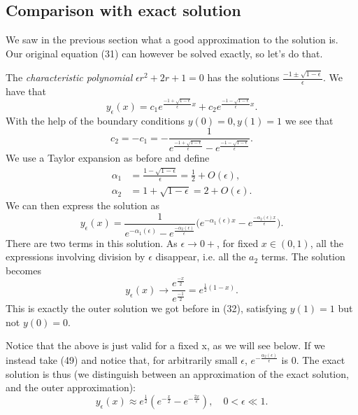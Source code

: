 \documentclass[12pt]{article}
\begin{document}
\subsection{Comparison with exact solution}

We saw in the previous section what a good approximation to the
solution is. Our original equation (31) can however be solved exactly,
so let's do that.

The \textit{characteristic polynomial} $\epsilon r^2 +2r + 1 = 0$ has
the solutions $\frac{-1 \pm \sqrt{1-\epsilon}}{\epsilon}$. We have
that
\begin{equation}
y_{\epsilon}(x)=c_1 e^{\frac{-1 + \sqrt{1-\epsilon}}{\epsilon} x} + c_2
e^{\frac{-1 - \sqrt{1-\epsilon}}{\epsilon} x}.
\end{equation}
With the help of the boundary conditions $y(0)=0, y(1)=1$ we see that
\begin{equation}
  c_2 = - c_1 = - \frac{1}{e^{\frac{-1 + \sqrt{1-\epsilon}}{\epsilon}}
    - e^{\frac{-1 - \sqrt{1-\epsilon}}{\epsilon}}}.
\end{equation}
We use a Taylor expansion as before and define
\begin{align}
  \alpha_1 &= \frac{1 - \sqrt{1-\epsilon}}{\epsilon} = \frac{1}{2} + O(\epsilon), \\
  \alpha_2 &= 1+ \sqrt{1-\epsilon} = 2 + O(\epsilon).
\end{align}
We can then express the solution as
\begin{equation}
  y_{\epsilon}(x) = \frac{1}{e^{-\alpha_1(\epsilon)} - e^{\frac{-\alpha_2(\epsilon)}{\epsilon}}} \Big(e^{-\alpha_1(\epsilon)x} - e^{\frac{-\alpha_2(\epsilon)x}{\epsilon}}\Big).
\end{equation}
There are two terms in this solution. As $\epsilon \to 0+$, for fixed
$x \in (0,1)$, all the expressions involving division by $\epsilon$
disappear, i.e. all the $a_2$ terms. The solution becomes
\begin{equation}
  y_{\epsilon}(x) \to \frac{e^{\frac{-x}{2}}}{e^{\frac{-1}{2}}} = e^{\frac{1}{2}(1-x)}.
\end{equation}
This is exactly the outer solution we got before in (32), satisfying
$y(1)=1$ but not $y(0)=0$.

Notice that the above is just valid for a fixed x, as we will see
below. If we instead take (49) and notice that, for arbitrarily small
$\epsilon$, $e^{-\frac{\alpha_2(\epsilon)}{\epsilon}}$ is 0. The exact
solution is thus (we distinguish between an approximation of the exact
solution, and the outer approximation):
\begin{equation}
  y_{\epsilon}(x) \approx e^{\frac{1}{2}}(e^{-\frac{x}{2}} -
  e^{-\frac{2x}{\epsilon}}), \quad 0 < \epsilon \ll 1.
\end{equation}
\end{document}
